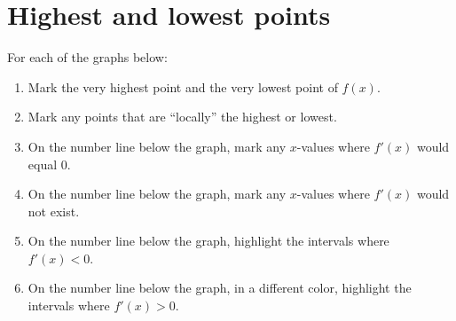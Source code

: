 
\usepackage{pgfplots}

\usepackage{tabularx}

\everymath{\displaystyle}

%

\newcommand{\signchart}{
\begin{tikzpicture}
    \begin{axis}[
        axis x line=middle, x axis line style = -,
        axis y line=none,
        height=50pt,
        xmin=-6, xmax=6, xtick distance = 1, xticklabels={},
        ymin=-0.5, ymax=0.5,
        axis equal image,
        scale only axis,
        width = \textwidth
    ]
    \end{axis}
    
\end{tikzpicture}
}

\allowdisplaybreaks
\section{Highest and lowest points}

For each of the graphs below:
\begin{enumerate}[leftmargin=15pt]
    \item Mark the very highest point and the very lowest point of $f(x)$.
    \item Mark any points that are ``locally'' the highest or lowest.
    \item On the number line below the graph, mark any $x$-values where $f'(x)$ would equal $0$.
    \item On the number line below the graph, mark any $x$-values where $f'(x)$ would not exist.
    \item On the number line below the graph, highlight the intervals where $f'(x) < 0$.
    \item On the number line below the graph, in a different color, highlight the intervals where $f'(x) > 0$.
\end{enumerate}


